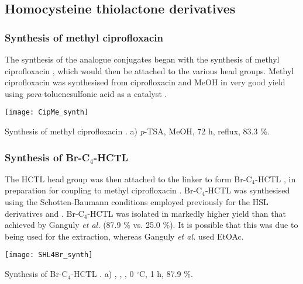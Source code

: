 \subsection{Homocysteine thiolactone derivatives\label{sec:HCTL}}

\subsubsection{Synthesis of methyl ciprofloxacin }

The synthesis of the analogue conjugates began with the synthesis of methyl ciprofloxacin , which would then be attached to the various head groups.
Methyl ciprofloxacin  was synthesised from ciprofloxacin  and MeOH in very good yield using \textit{para}-toluenesulfonic acid as a catalyst \cite{Sachin2010}.

\begin{scheme}[H]
	\begin{center}
		\texttt{[image: CipMe\_synth]}
		\caption{Synthesis of methyl ciprofloxacin . a) \textit{p}-TSA, MeOH, 72 h, reflux, 83.3 \%. \label{sch:CipMe_synth}}
	\end{center}
\end{scheme}

\subsubsection{Synthesis of Br-C$_4$-HCTL }

The HCTL head group was then attached to the linker to form Br-C$_4$-HCTL , in preparation for coupling to methyl ciprofloxacin .
Br-C$_4$-HCTL  was synthesised using the Schotten-Baumann conditions employed previously for the HSL derivatives  and . Br-C$_4$-HCTL  was isolated in markedly higher yield than that achieved by Ganguly \textit{et al.}\cite{Ganguly2011} (87.9 \% vs. 25.0 \%). It is possible that this was due to  being used for the extraction, whereas Ganguly \textit{et al.} used EtOAc.

\begin{scheme}[H]
	\begin{center}
		\texttt{[image: SHL4Br\_synth]}
		\caption{Synthesis of Br-C$_4$-HCTL . a) , , , 0 $^{\circ}$C, 1 h, 87.9 \%.\label{sch:SHL4Br_synth}}
	\end{center}
\end{scheme}

